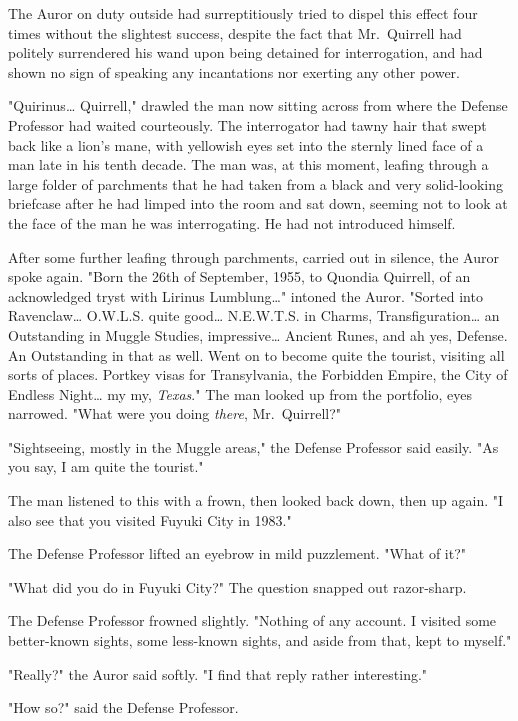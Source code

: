 The Auror on duty outside had surreptitiously tried to dispel this effect four
times without the slightest success, despite the fact that Mr.~Quirrell had
politely surrendered his wand upon being detained for interrogation, and had
shown no sign of speaking any incantations nor exerting any other power.

"Quirinus{\ldots} Quirrell," drawled the man now sitting across from where the
Defense Professor had waited courteously. The interrogator had tawny hair that
swept back like a lion's mane, with yellowish eyes set into the sternly lined
face of a man late in his tenth decade. The man was, at this moment, leafing
through a large folder of parchments that he had taken from a black and very
solid-looking briefcase after he had limped into the room and sat down, seeming
not to look at the face of the man he was interrogating. He had not introduced
himself.

After some further leafing through parchments, carried out in silence, the
Auror spoke again. "Born the 26th of September, 1955, to Quondia Quirrell, of
an acknowledged tryst with Lirinus Lumblung{\ldots}" intoned the Auror. "Sorted
into Ravenclaw{\ldots} O.W.L.S. quite good{\ldots} N.E.W.T.S. in Charms,
Transfiguration{\ldots} an Outstanding in Muggle Studies, impressive{\ldots}
Ancient Runes, and ah yes, Defense. An Outstanding in that as well. Went on to
become quite the tourist, visiting all sorts of places. Portkey visas for
Transylvania, the Forbidden Empire, the City of Endless Night{\ldots} my my,
\emph{Texas}." The man looked up from the portfolio, eyes narrowed. "What were
you doing \emph{there}, Mr.~Quirrell?"

"Sightseeing, mostly in the Muggle areas," the Defense Professor said easily.
"As you say, I am quite the tourist."

The man listened to this with a frown, then looked back down, then up again. "I
also see that you visited Fuyuki City in 1983."

The Defense Professor lifted an eyebrow in mild puzzlement. "What of it?"

"What did you do in Fuyuki City?" The question snapped out razor-sharp.

The Defense Professor frowned slightly. "Nothing of any account. I visited some
better-known sights, some less-known sights, and aside from that, kept to
myself."

"Really?" the Auror said softly. "I find that reply rather interesting."

"How so?" said the Defense Professor.

